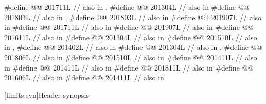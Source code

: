 \begin{codeblock}
#define @@                  201711L // also in , 
#define @@                       201304L // also in 
#define @@                       201803L // also in , 
#define @@                           201803L // also in 
#define @@              201907L // also in 
#define @@                        201711L // also in 
#define @@                          201907L // also in 
#define @@                          201611L // also in 
#define @@      201304L // also in 
#define @@             201510L // also in , 
#define @@                   201402L // also in 
#define @@                    201304L // also in , 
#define @@                     201806L // also in 
#define @@     201510L // also in 
#define @@               201411L // also in 
#define @@         201411L // also in 
#define @@                        201811L // also in 
#define @@                           201606L // also in 
#define @@                            201411L // also in 
\end{codeblock}

[limits.syn]{Header  synopsis}

%
%
%
%
%

